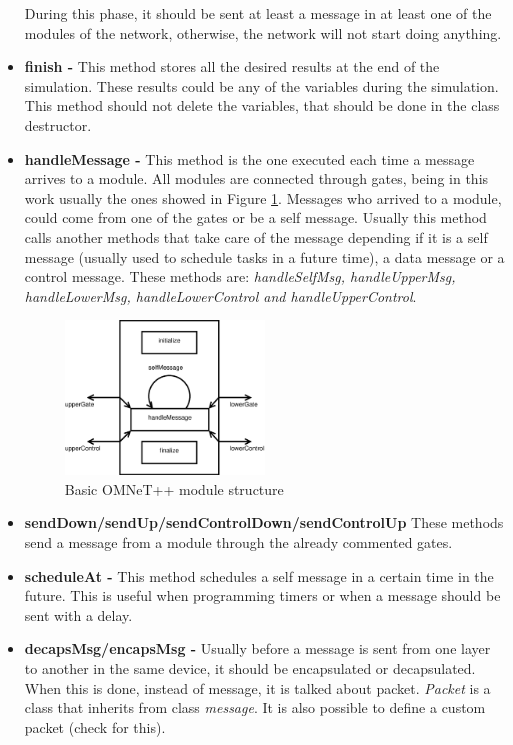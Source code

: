\begin{itemize}
During this phase, it should be sent at least a message in at least one of the modules of the network, otherwise, the network will not start doing 
anything.
 \item \textbf{finish - }This method stores all the desired results at the end of the simulation. These results could be any of the variables during the 
simulation. This method should not delete the variables, that should be done in the class destructor.
 \item \textbf{handleMessage - }This method is the one executed each time a message arrives to a module. All modules are connected through gates,
being in this work usually the ones showed in Figure \ref{fig:omnetmodule}. Messages who arrived to a module, could come from one of the gates or be a self
message. Usually this method calls another methods that take care of the message depending if it is a self message (usually used to schedule 
tasks in a future time), a data message or a control message. These methods are: \textit{handleSelfMsg, handleUpperMsg, handleLowerMsg, 
handleLowerControl and handleUpperControl}.
\begin{figure}[ht]
 \begin{center}
  \includegraphics[width=0.5\textwidth]{omnetmodule.eps}
 \end{center}
 \caption{Basic \ac{OMNeT++} module structure}
 \label{fig:omnetmodule}
\end{figure}
 \item \textbf{sendDown/sendUp/sendControlDown/sendControlUp }These methods send a message from a module through the already commented gates.
 \item \textbf{scheduleAt - }This method schedules a self message in a certain time in the future. This is useful when programming timers or when a
message should be sent with a delay.
 \item \textbf{decapsMsg/encapsMsg - }Usually before a message is sent from one layer to another in the same device, it should be encapsulated or 
decapsulated. When this is done, instead of message, it is talked about packet. \textit{Packet} is a class that inherits from class \textit{message}. It 
is also possible to define a custom packet (check \cite{manualomnet} for this).
\end{itemize}

